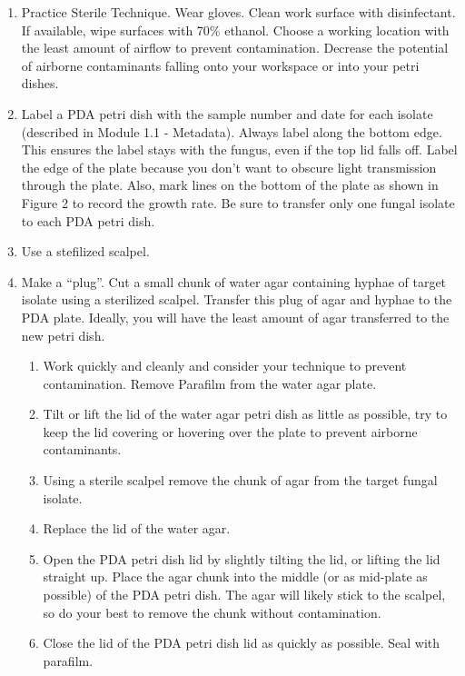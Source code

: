 \documentclass[
  letterpaper,
  DIV=11,
  numbers=noendperiod]{scrreprt}
\providecommand{\tightlist}{%
  \setlength{\itemsep}{0pt}\setlength{\parskip}{0pt}}
\begin{document}
\begin{enumerate}
\def\labelenumi{\arabic{enumi}.}
\tightlist
\item
  Practice Sterile Technique. Wear gloves. Clean work surface with
  disinfectant. If available, wipe surfaces with 70\% ethanol. Choose a
  working location with the least amount of airflow to prevent
  contamination. Decrease the potential of airborne contaminants falling
  onto your workspace or into your petri dishes.
\item
  Label a PDA petri dish with the sample number and date for each
  isolate (described in Module 1.1 - Metadata). Always label along the
  bottom edge. This ensures the label stays with the fungus, even if the
  top lid falls off. Label the edge of the plate because you don't want
  to obscure light transmission through the plate. Also, mark lines on
  the bottom of the plate as shown in Figure 2 to record the growth
  rate. Be sure to transfer only one fungal isolate to each PDA petri
  dish.
\item
  Use a stefilized scalpel.
\item
  Make a ``plug''. Cut a small chunk of water agar containing hyphae of
  target isolate using a sterilized scalpel. Transfer this plug of agar
  and hyphae to the PDA plate. Ideally, you will have the least amount
  of agar transferred to the new petri dish.

  \begin{enumerate}
  \def\labelenumii{\alph{enumii}.}
  \tightlist
  \item
    Work quickly and cleanly and consider your technique to prevent
    contamination. Remove Parafilm from the water agar plate.
  \item
    Tilt or lift the lid of the water agar petri dish as little as
    possible, try to keep the lid covering or hovering over the plate to
    prevent airborne contaminants.
  \item
    Using a sterile scalpel remove the chunk of agar from the target
    fungal isolate.
  \item
    Replace the lid of the water agar.
  \item
    Open the PDA petri dish lid by slightly tilting the lid, or lifting
    the lid straight up. Place the agar chunk into the middle (or as
    mid-plate as possible) of the PDA petri dish. The agar will likely
    stick to the scalpel, so do your best to remove the chunk without
    contamination.
  \item
    Close the lid of the PDA petri dish lid as quickly as possible. Seal
    with parafilm.
  \end{enumerate}
\end{enumerate}
\end{document}
